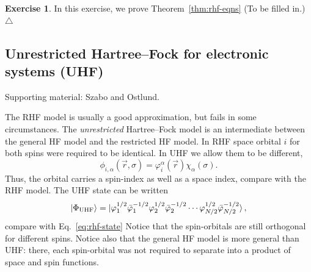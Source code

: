 \documentclass{report}
\theoremstyle{plain}
\theoremstyle{definition}
\newtheorem{exerc}{Exercise}[chapter]
\newcommand\xqed[1]{%
  \leavevmode\unskip\penalty9999 \hbox{}\nobreak\hfill
  \quad\hbox{#1}}
\newcommand\demo{\xqed{$\triangle$}}
\newenvironment{exercise}{\bigskip\begin{exerc}}{\demo\end{exerc}\bigskip}
\begin{document}
\begin{exercise}\label{exercise:rhf-equations}
  In this exercise, we prove Theorem~\ref{thm:rhf-eqns} (To be filled in.)
\end{exercise}

\subsection{Unrestricted Hartree--Fock for electronic systems (UHF)}


Supporting material: Szabo and Ostlund.

The RHF model is usually a good approximation, but fails in some
circumstances. The \emph{unrestricted} Hartree--Fock model is an
intermediate between the general HF model and the restricted HF
model. In RHF space orbital $i$ for both spins were required to be
identical. In UHF we allow them to be different,
\begin{equation}
  \phi_{i,\alpha}(\vec{r},\sigma) =
  \varphi_{i}^{\alpha}(\vec{r})\chi_\alpha(\sigma).
\end{equation}
Thus, the orbital carries a spin-index as well as a space index,
compare with the RHF model. The UHF state can be written
\begin{equation}
  \ket{\Phi_{\text{UHF}}} = \ket{\varphi_1^{1/2}
    \bar{\varphi}_1^{-1/2} \varphi_2^{1/2} \bar{\varphi}_2^{-1/2}
    \cdots \varphi_{N/2}^{1/2} \bar{\varphi}_{N/2}^{-1/2}},\label{eq:uhf-state}
\end{equation}
compare with Eq.~\eqref{eq:rhf-state}
Notice that the spin-orbitals are still orthogonal for different
spins. Notice also that the general HF model is more general than UHF:
there, each spin-orbital was not required to separate into a product
of space and spin functions.
\end{document}
